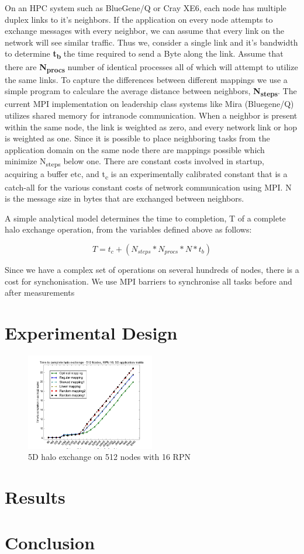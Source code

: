 \documentclass{acm_proc_article-sp}
\begin{document}
On an HPC system such as BlueGene/Q or Cray XE6, each node has multiple duplex links to it's neighbors.
If the application on every node attempts to exchange messages with every neighbor, we can assume that
every link on the network will see similar traffic. Thus we, consider a single link and it's bandwidth
to determine \textbf{t\textsubscript{b}} the time required to send a Byte along the link.
Assume that there are \textbf{N\textsubscript{procs}} number of identical processes all of which will attempt to utilize the same links.
To capture the differences between different mappings we use a simple program to calculare the average distance between neighbors,
\textbf{N\textsubscript{steps}}. The current MPI implementation on leadership class systems like Mira (Bluegene/Q) utilizes
shared memory for intranode communication. When a neighbor is present within the same node, the link
is weighted as zero, and every network link or hop is weighted as one. Since it is possible to place
neighboring tasks from the application domain on the same node there are mappings possible which
minimize N\textsubscript{steps} below one. There are constant costs involved in startup, acquiring a buffer etc,
and t\textsubscript{c} is an experimentally calibrated constant that is a catch-all for the various constant costs
of network communication using MPI. N is the message size in bytes that are exchanged between neighbors.

A simple analytical model determines the time to completion, T of a complete halo exchange operation,
from the variables defined above as follows:

\begin{equation}
  T = t_c + (N_{steps} * N_{procs} * N * t_b)
\end{equation}

Since we have a complex set of operations on several hundreds of nodes, there is a cost for synchonisation.
We use MPI barriers to synchronise all tasks before and after measurements

\section{Experimental Design}

\label{sect:3D Halo plot}
\begin{figure}
  \center
  \includegraphics[width=0.5\textwidth]{5D_512_most_mappings_2.png}
  \caption{5D halo exchange on 512 nodes with 16 RPN}
    \label{fig:3D halo exchange on 512 nodes with 16 RPN}
\end{figure}


\section{Results}

\section{Conclusion}




\end{document}
